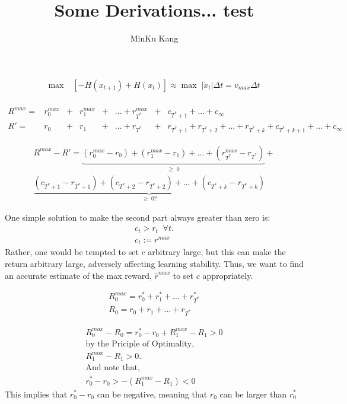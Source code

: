 \documentclass[12pt]{article}
\begin{document}
 
  
\title{Some Derivations... test}

\author{MinKu Kang}
 
\maketitle

\begin{align}
\max \; &\left[ - H(x_{t+1}) + H(x_{t}) \right] \approx 
\max \; | \dot{x}_t  | \Delta t = v_{max} \Delta t \\
\end{align}

\begin{align*}
R^{max} = &r_0^{max} &+ &r_1^{max} &+& ...  + r_{T^*}^{max} &+ &c_{T^{*}+1} + ... + c_{\infty} \\
R' = &r_0 &+ &r_1 &+& ... + r_{T^*} &+ &r_{T^{*}+1} + r_{T^{*}+2} + ... + r_{T^{*}+k} + c_{T^{*}+k+1} + ... + c_{\infty}  
\end{align*}

\begin{align*}
R^{max} - R' = \underbrace{(r_0^{max} - r_0) + (r_1^{max} - r_1) + ... + (r_{T^*}^{max} - r_{T^*})}_{\geq \; 0} + \\
\underbrace{(c_{T^{*}+1} - r_{T^{*}+1}) + (c_{T^{*}+2} - r_{T^{*}+2}) + ... + (c_{T^{*}+k} - r_{T^{*}+k})}_{\geq \; 0 ? }
\end{align*}

One simple solution to make the second part always greater than zero is:
\begin{align*}
c_t > r_t \;\; \forall t. \\
c_t := r^{max}
\end{align*}
Rather, one would be tempted to set $c$ arbitrary large, but this can make the return arbitrary large, adversely affecting learning stability. Thus, we want to find an accurate estimate of the max reward, $\hat{r}^{max}$ to set $c$ appropriately.

\begin{align*}
R_0^{max} = r_0^* + r_1^* + ... + r_{T^*}^* \\
R_0 = r_0 + r_1 + ... + r_{T^*}
\end{align*}

\begin{align*}
R_0^{max} - R_0 = r_0^* - r_0 + R_1^{max} - R_1 > 0 \\
\text{by the Priciple of Optimality,} \\
R_1^{max} - R_1 > 0. \\
\text{And note that,} \\
r_0^* - r_0 > - (R_1^{max} - R_1) < 0 
\end{align*}
This implies that $r_0^* - r_0$ can be negative, meaning that $r_0$ can be larger than $r_0^*$ 
\end{document}
